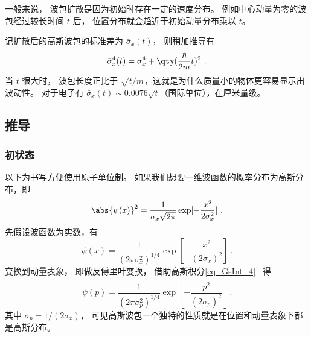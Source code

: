 一般来说， 波包扩散是因为初始时存在一定的速度分布。 例如中心动量为零的波包经过较长时间 $t$ 后， 位置分布就会趋近于初始动量分布乘以 $t$。

记扩散后的高斯波包的标准差为 $\bar\sigma_x(t)$， 则稍加推导有
\begin{equation}
\bar\sigma^4_x(t) = \sigma_x^4 + \qty(\frac{\hbar}{2m}t)^2~.
\end{equation}
当 $t$ 很大时， 波包长度正比于 $\sqrt{t/m}$，这就是为什么质量小的物体更容易显示出波动性。 对于电子有 $\bar\sigma_x(t) \sim 0.0076\sqrt{t}$（国际单位），在厘米量级。

\subsection{推导}
\subsubsection{初状态}

以下为书写方便使用原子单位制。 如果我们想要一维波函数的概率分布为高斯分布，即
\begin{equation}
\abs{\psi (x)}^2 = \frac{1}{\sigma_x \sqrt{2\pi}} \exp[-\frac{x^2}{2\sigma_x^2}]~.
\end{equation}
先假设波函数为实数，有
\begin{equation}
\psi (x) = \frac{1}{(2\pi\sigma_x^2)^{1/4}} \exp[-\frac{x^2}{(2\sigma_x)^2}]~.
\end{equation}
变换到动量表象， 即做反傅里叶变换， 借助高斯积分\autoref{eq_GsInt_4}~ 得
\begin{equation}
\psi(p) = \frac{1}{(2\pi\sigma_p^2)^{1/4}} \exp[-\frac{p^2}{(2\sigma_p)^2}]~.
\end{equation}
其中 $\sigma_p = 1/(2\sigma_x)$， 可见高斯波包一个独特的性质就是在位置和动量表象下都是高斯分布。

